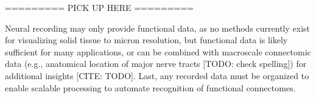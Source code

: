 \documentclass[11pt]{article}
\begin{document}
========= PICK UP HERE =========

Neural recording may only provide functional data, as no methods currently exist for visualizing solid tissue to micron resolution, but functional data is likely sufficient for many applications, or can be combined with macroscale connectomic data (e.g., anatomical location of major nerve tracts [TODO: check spelling]) for additional insights  [CITE: TODO]. Last, any recorded data must be organized to enable scalable processing to automate recognition of functional connectomes.




\end{document}
